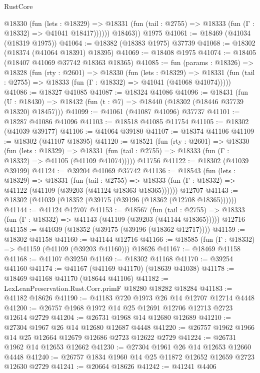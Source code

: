 \begin{lexlean}{RustCore}
\begin{coremodule}
            @18330
              (fun (lets : @18329) =>
              @18331 (fun (tail : @2755) => @18333 (fun (Γ : @18332) => @41041 @18417))))))
        @18463))
    @1975
@41061 := @18469 (@41034 (@18319 @1975))
@41064 := @18382 (@18383 @1975) @37739
@41068 := @18302 (@18374 (@41064 @18391) @18395)
@41069 := @18408 @1975
@41074 := @18405 (@18407 @41069 @37742 @18363 @18365)
@41085 := fun (params : @18326) =>
  @18328
    (fun (rty : @2601) =>
    @18330
      (fun (lets : @18329) =>
      @18331 (fun (tail : @2755) => @18333 (fun (Γ : @18332) => @41041 (@41068 @41074)))))
@41086 := @18327 @41085
@41087 := @18324 @41086
@41096 := @18431
    (fun (U : @18430) => @18432 (fun (t : @7) => @18440 (@18302 (@18446 @37739 @18320) @18457)))
@41099 := @41061 (@41087 @41096) @37737
@41101 := @18287 @41086 @41096
@41103 := @18518 @41085 @11754
@41105 := @18302 (@41039 @39177)
@41106 := @41064 @39180
@41107 := @18374 @41106
@41109 := @18302 (@41107 @18395)
@41120 := @18521
    (fun (rty : @2601) =>
    @18330
      (fun (lets : @18329) =>
      @18331 (fun (tail : @2755) => @18333 (fun (Γ : @18332) => @41105 (@41109 @41074)))))
    @11756
@41122 := @18302 (@41039 @39199)
@41124 := @39204 @41069 @37742
@41136 := @18543
    (fun (lets : @18329) =>
    @18331
      (fun (tail : @2755) =>
      @18333 (fun (Γ : @18332) => @41122 (@41109 (@39203 (@41124 @18363 @18365))))))
    @12707
@41143 := @18302 (@41039 (@18352 (@39175 (@39196 (@18362 (@12708 @18365))))))
@41144 := @41124 @12707
@41153 := @18567
    (fun (tail : @2755) => @18333 (fun (Γ : @18332) => @41143 (@41109 (@39203 (@41144 @18365)))))
    @12716
@41158 := @41039 (@18352 (@39175 (@39196 (@18362 @12717))))
@41159 := @18302 @41158
@41160 := @41144 @12716
@41166 := @18585 (fun (Γ : @18332) => @41159 (@41109 (@39203 @41160))) @18626
@41167 := @18469 @41158
@41168 := @41107 @39250
@41169 := @18302 @41168
@41170 := @39254 @41160
@41174 := @41167 (@41169 @41170) (@18639 @41038)
@41178 := @18469 @41168 @41170 (@18644 @41106)
@41182 := LexLeanPreservation.Rust.Corr.primF @18280 @18282 @18284
@41183 := @41182 @18626
@41190 := @41183 @720 @1973 @26 @14 @12707 @12714 @4448
@41200 := @26757 @1968 @1972 @14 @25 @12691 @12706 @12713 @2723 @12614 @2729
@41204 := @26731 @1968 @14 @12680 @12689
@41210 := @27304 @1967 @26 @14 @12680 @12687 @4448
@41220 := @26757 @1962 @1966 @14 @25 @12664 @12679 @12686 @2723 @12622 @2729
@41224 := @26731 @1962 @14 @12653 @12662
@41230 := @27304 @1961 @26 @14 @12653 @12660 @4448
@41240 := @26757 @1834 @1960 @14 @25 @11872 @12652 @12659 @2723 @12630 @2729
@41241 := @20664 @18626
@41242 := @41241 @4406

\end{coremodule}
\end{lexlean}
